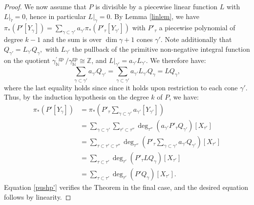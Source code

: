 \documentclass[12pt, oneside]{amsart}   	%
\newcommand{\NN}{\mathbb{N}}
\newcommand{\ZZ}{\mathbb{Z}}
\newcommand{\gp}{\operatorname{gp}}
\numberwithin{equation}{section}
\numberwithin{thm}{section}
\numberwithin{figure}{section}
\begin{document}
\begin{proof}


We now assume that $P$ is divisible by a piecewise linear function $L$ with $L|_{\tilde{\tau}} = 0$, hence in particular $L|_{\gamma} = 0$. By Lemma \ref{linlem}, we have $\pi_*(P'[Y_{\gamma}]) = \sum_{\gamma\subset \gamma'} a_{\gamma'}\pi_*(P'_{\tau}[Y_{\gamma'}])$ with $P'_{\tau}$ a piecewise polynomial of degree $k-1$ and the sum is over $\dim \gamma + 1$ cones $\gamma'$. Note additionally that $Q_{\gamma'} = L_{\gamma'}Q_{\gamma},$ with $L_{\gamma'}$ the pullback of the primitive non-negative integral function on the quotient $\gamma^{'\gp}_{\NN}/\gamma_{\NN}^{\gp} \cong \ZZ$, and $L|_{\gamma'} = a_{\gamma'}L_{\gamma'}$. We therefore have: 
$$\sum_{\gamma\subset \gamma'}a_{\gamma'}Q_{\gamma'} = \sum_{\gamma\subset \gamma'}a_{\gamma'}L_{\gamma'}Q_{\gamma} = LQ_{\gamma},$$
where the last equality holds since since it holds upon restriction to each cone $\gamma'$. Thus, by the induction hypothesis on the degree $k$ of $P$, we have:
\begin{equation}\label{pushp'}
\begin{split}
\pi_*(P'[Y_{\gamma}]) &= \pi_*(P'_{\tau}\sum_{\gamma \subset \gamma'} a_{\gamma'}[Y_{\gamma'}]) \\
&= \sum_{\gamma\subset \gamma'}\sum_{\tau' \subset \tau''} \deg_{\tau''}(a_{\gamma'}P'_{\tau}Q_{\gamma'})[X_{\tau'}]\\
&= \sum_{\tau\subset \tau' \subset \tau''} \deg_{\tau''}(P'_{\tau}\sum_{\gamma \subset \gamma'}a_{\gamma'}Q_{\gamma'})[X_{\tau'}]\\
&=  \sum_{\tau \subset \tau'} \deg_{\tau'}(P'_{\tau}LQ_{\gamma})[X_{\tau'}]\\
&=  \sum_{\tau \subset \tau'} \deg_{\tau'}(P'Q_{\gamma})[X_{\tau'}].
\end{split}
\end{equation}
Equation \ref{pushp'} verifies the Theorem in the final case, and the desired equation follows by linearity.


\end{proof}
\end{document}
